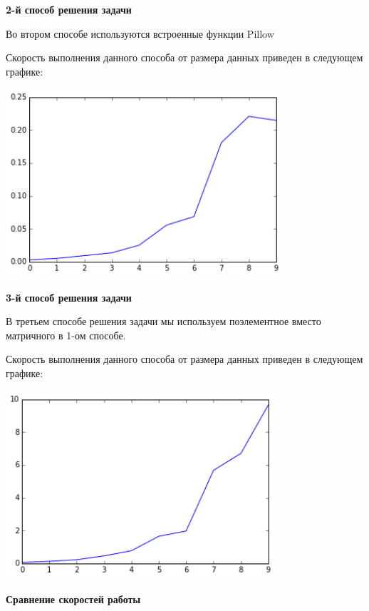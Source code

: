 \documentclass[12pt, a4paper]{article}
\begin{document}
			{\bf 2-й способ решения задачи\\}

				Во втором способе используются встроенные функции Pillow

				Скорость выполнения данного способа от размера данных приведен в следующем графике:
				\begin{center}
					\includegraphics[height=7cm]{timeit/num5_ti2.png}
				\end{center}


			{\bf 3-й способ решения задачи\\}

				В третьем способе решения задачи мы используем поэлементное вместо матричного в 1-ом способе.

				Скорость выполнения данного способа от размера данных приведен в следующем графике:
				\begin{center}
					\includegraphics[height=7cm]{timeit/num5_ti3.png}
				\end{center}


			{\bf Сравнение скоростей работы\\}
\end{document}
